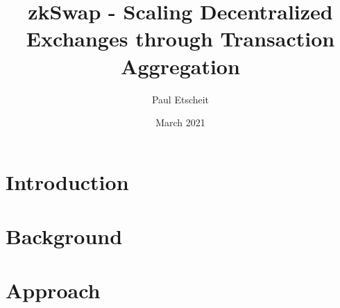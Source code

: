 \documentclass[11pt,twoside,a4paper,final]{book}
\title{zkSwap - Scaling Decentralized Exchanges through Transaction Aggregation}
\author{Paul Etscheit}
\date{March 2021}
\begin{document}
\begin{titlepage}
    \maketitle
\end{titlepage}

\tableofcontents
\section{Introduction}


\section{Background}


\section{Approach}




\end{document}

